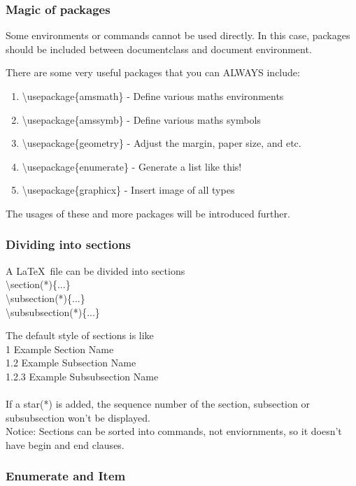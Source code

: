\documentclass{beamer}
\begin{document}
\begin{frame}
	\frametitle{Magic of packages}
	\begin{definition}
		Some environments or commands cannot be used directly. In this case,  {\color{blue}packages} should be included between {\color{blue}documentclass} and {\color{blue}document environment}.
	\end{definition}
	There are some very useful packages that you can {\color{blue}ALWAYS} include:
	\begin{enumerate}
		\item {\color{red}\textbackslash usepackage\{amsmath\}} - Define various maths environments
		\item {\color{red}\textbackslash usepackage\{amssymb\}} - Define various maths symbols
		\item {\color{red}\textbackslash usepackage\{geometry\}} - Adjust the margin, paper size, and etc.
		\item {\color{red}\textbackslash usepackage\{enumerate\}} - Generate a list like this!
		\item {\color{red}\textbackslash usepackage\{graphicx\}} - Insert image of all types
	\end{enumerate}
	The usages of these and more packages will be introduced further.
\end{frame}

\begin{frame}
	\frametitle{Dividing into sections}
	\begin{definition}
		A \LaTeX\ file can be divided into sections\\
		{\color{red}\textbackslash section(*)\{...\}}\\
		{\color{red}\textbackslash subsection(*)\{...\}}\\
		{\color{red}\textbackslash subsubsection(*)\{...\}}\\
	\end{definition}
	The default style of sections is like\\
	{\color{blue}1 Example Section Name}\\
	{\color{blue}1.2 Example Subsection Name}\\
	{\color{blue}1.2.3 Example Subsubsection Name}\\
	\ \\
	If a star({\color{blue}*}) is added, the sequence number of the section, subsection or subsubsection won't be displayed.\\
	{\color{blue}Notice:} Sections can be sorted into commands, not enviornments, so it doesn't have {\color{blue}begin} and {\color{blue}end} clauses.
\end{frame}
\begin{frame}
	\frametitle{Enumerate and Item}


\end{frame}
\begin{frame}

\end{frame}
\end{document}
